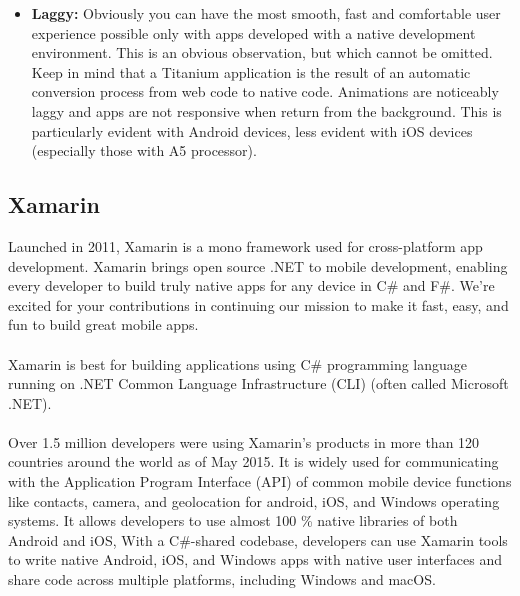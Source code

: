 \begin{itemize}
 \item \textbf{Laggy:}   Obviously you can have the most smooth, fast and comfortable user experience possible only with apps developed with a native development environment. This is an obvious observation, but which cannot be omitted. Keep in mind that a Titanium application is the result of an automatic conversion process from web code to native code. Animations are noticeably laggy and apps are not responsive when return from the background. This is particularly evident with Android devices, less evident with iOS devices (especially those with A5 processor).
\end{itemize}



\subsection{Xamarin}
Launched in 2011, Xamarin is a mono framework used for cross-platform app development. Xamarin brings open source .NET to mobile development, enabling every developer to build truly native apps for any device in C\# and F\#.
We’re excited for your contributions in continuing our mission to make it fast, easy, and fun to build great mobile apps.

\paragraph{}

Xamarin is best for building applications using C\# programming language running on .NET Common Language Infrastructure (CLI) (often called Microsoft .NET).
\paragraph{}
Over 1.5 million developers were using Xamarin's products in more than 120 countries around the world as of May 2015.
It is widely used for communicating with the Application Program Interface (API) of common mobile device functions like contacts, camera, and geolocation for android, iOS, and Windows operating systems.
It allows developers to use almost 100 \% native libraries of both Android and iOS, With a C\#-shared codebase, developers can use Xamarin tools to write native Android, iOS, and Windows apps with native user interfaces and share code across multiple platforms, including Windows and macOS.

